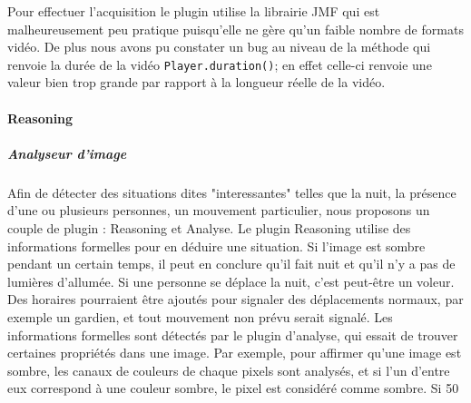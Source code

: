 	Pour effectuer l'acquisition le plugin utilise la librairie JMF qui est malheureusement peu pratique puisqu'elle ne gère qu'un faible nombre de formats vidéo. De plus nous avons pu constater un bug au niveau de la méthode qui renvoie la durée de la vidéo \verb+Player.duration()+; en effet celle-ci renvoie une valeur bien trop grande par rapport à la longueur réelle de la vidéo.

		\paragraph{Reasoning}
			\subparagraph{Analyseur d'image}
				Afin de détecter des situations dites "interessantes" telles que la nuit, la présence d'une ou plusieurs personnes, un mouvement particulier, nous proposons un couple de plugin : Reasoning et Analyse. Le plugin Reasoning utilise des informations formelles pour en déduire une situation. Si l'image est sombre pendant un certain temps, il peut en conclure qu'il fait nuit et qu'il n'y a pas de lumières d'allumée. Si une personne se déplace la nuit, c'est peut-être un voleur. Des horaires pourraient être ajoutés pour signaler des déplacements normaux, par exemple un gardien, et tout mouvement non prévu serait signalé.
	Les informations formelles sont détectés par le plugin d'analyse, qui essait de trouver certaines propriétés dans une image. Par exemple, pour affirmer qu'une image est sombre, les canaux de couleurs de chaque pixels sont analysés, et si l'un d'entre eux correspond à une couleur sombre, le pixel est considéré comme sombre. Si 50%
	
